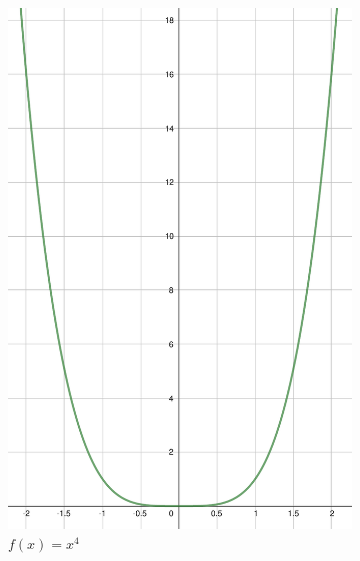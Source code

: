 \begin{figure}[h]
    \centering
    \begin{subfigure}{0.35\textwidth}
        \includegraphics[width=\textwidth]{tex/chapter_1/assets/y=x^4.pdf}
        \caption*{$f(x) = x^4$}
    \end{subfigure}
    \hfill
    \begin{subfigure}{0.35\textwidth}

\end{subfigure}
\end{figure}
